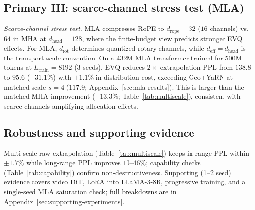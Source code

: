 
\FloatBarrier

\subsection{Primary III: scarce-channel stress test (MLA)}
\label{sec:exp-mla}

\emph{Scarce-channel stress test.} MLA \citep{deepseekv2, deepseekv3} compresses RoPE to $d_{\mathrm{rope}}{=}32$ ($16$ channels) vs.\ $64$ in MHA at $d_{\mathrm{head}}{=}128$, where the finite-budget view predicts stronger EVQ effects. For MLA, $d_{\mathrm{rot}}$ determines quantized rotary channels, while $d_{\mathrm{eff}}{=}d_{\mathrm{head}}$ is the transport-scale convention. On a $432$M MLA transformer trained for $500$M tokens at $L_{\mathrm{train}}{=}8192$ ($3$ seeds), EVQ reduces $2\times$ extrapolation PPL from $138.8$ to $95.6$ ($-31.1\%$) with $+1.1\%$ in-distribution cost, exceeding Geo+YaRN at matched scale $s{=}4$ ($117.9$; Appendix~\ref{sec:mla-results}). This is larger than the matched MHA improvement ($-13.3\%$; Table~\ref{tab:multiscale}), consistent with scarce channels amplifying allocation effects.

\subsection{Robustness and supporting evidence}
\label{sec:exp-robust}
Multi-scale raw extrapolation (Table~\ref{tab:multiscale}) keeps in-range PPL within ${\pm}1.7\%$ while long-range PPL improves $10$--$46\%$; capability checks (Table~\ref{tab:capability}) confirm non-destructiveness. Supporting (1--2 seed) evidence covers video DiT, LoRA into LLaMA-3-8B, progressive training, and a single-seed MLA saturation check; full breakdowns are in Appendix~\ref{sec:supporting-experiments}.
